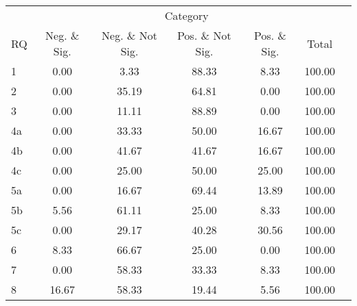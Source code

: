 \begin{tabular}{lcccccc}
\hline
\hline
 & \multicolumn{5}{c}{Category} \\
RQ&Neg. \& Sig.&Neg. \& Not Sig.&Pos. \& Not Sig.&Pos. \& Sig.&Total \\
%
\hline
1&0.00&3.33&88.33&8.33&100.00 \\
2&0.00&35.19&64.81&0.00&100.00 \\
3&0.00&11.11&88.89&0.00&100.00 \\
4a&0.00&33.33&50.00&16.67&100.00 \\
4b&0.00&41.67&41.67&16.67&100.00 \\
4c&0.00&25.00&50.00&25.00&100.00 \\
5a&0.00&16.67&69.44&13.89&100.00 \\
5b&5.56&61.11&25.00&8.33&100.00 \\
5c&0.00&29.17&40.28&30.56&100.00 \\
6&8.33&66.67&25.00&0.00&100.00 \\
7&0.00&58.33&33.33&8.33&100.00 \\
8&16.67&58.33&19.44&5.56&100.00 \\
\hline
\hline
\end{tabular}
